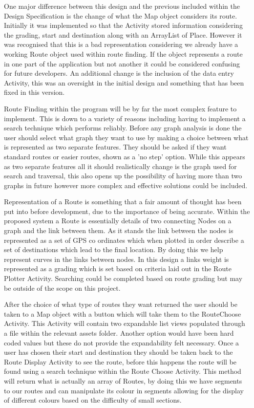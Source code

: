 One major difference between this design and the previous included within the Design Specification is the change of what the Map object considers its route. Initially it was implemented so that the Activity stored information considering the grading, start and destination along with an ArrayList of Place. However it was recognised that this is a bad representation considering we already have a working Route object used within route finding. If the object represents a route in one part of the application but not another it could be considered confusing for future developers. An additional change is the inclusion of the data entry Activity, this was an oversight in the initial design and something that has been fixed in this version. 

Route Finding within the program will be by far the most complex feature to implement. This is down to a variety of reasons including having to implement a search technique which performs reliably. Before any graph analysis is done the user should select
 what graph they want to use by making a choice between what is represented as two separate features. They should be asked if they want standard routes or easier routes, shown as a 'no step' option. While this appears as two separate features all it should realistically change is the graph used for search and traversal, this also opens up the possibility of having more than two graphs in future however more complex and effective solutions could be included. 
 
Representation of a Route is something that a fair amount of thought has been put into before development, due to the importance of being accurate. Within the proposed system a Route is essentially details of two connecting Nodes on a graph and the link between them. As it stands the link between the nodes is represented as a set of GPS co ordinates which when plotted in order describe a set of destinations which lead to the final location. By doing this we help represent curves in the links between nodes. In this design a links weight is represented as a grading which is set based on criteria laid out in the Route Plotter Activity. Searching could be completed based on route grading but may be outside of the scope on this project. 
 
After the choice of what type of routes they want returned the user should be taken to a Map object with a button which will take them to the RouteChoose Activity. This Activity will contain two expandable list views populated through a file within the relevant assets folder. Another option would have been hard coded values but these do not provide the expandability felt necessary. Once a user has chosen their start and destination they should be taken back to the Route Display Activity to see the route, before this happens the route will be found using a search technique within the Route Choose Activity. This method will return what is actually an array of Routes, by doing this we have segments to our routes and can manipulate its colour in segments allowing for the display of different colours based on the difficulty of small sections.


